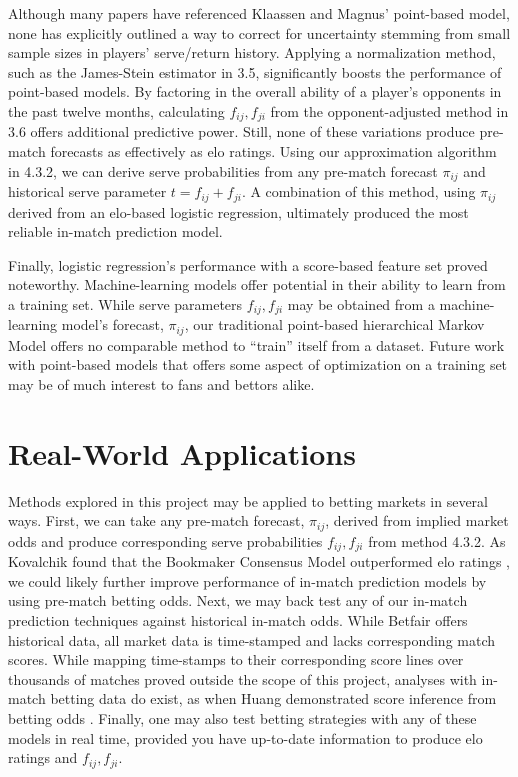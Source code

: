 \documentclass[chapterprefix=false]{report}
\begin{document}
Although many papers have referenced Klaassen and Magnus' point-based model, none has explicitly outlined a way to correct for uncertainty stemming from small sample sizes in players' serve/return history. Applying a normalization method, such as the James-Stein estimator in 3.5, significantly boosts the performance of point-based models. By factoring in the overall ability of a player's opponents in the past twelve months, calculating $f_{ij},f_{ji}$ from the opponent-adjusted method in 3.6 offers additional predictive power. Still, none of these variations produce pre-match forecasts as effectively as elo ratings. Using our approximation algorithm in 4.3.2, we can derive serve probabilities from any pre-match forecast $\pi_{ij}$ and historical serve parameter $t = f_{ij} + f_{ji}$. A combination of this method, using $\pi_{ij}$ derived from an elo-based logistic regression, ultimately produced the most reliable in-match prediction model.

Finally, logistic regression's performance with a score-based feature set proved noteworthy. Machine-learning models offer potential in their ability to learn from a training set. While serve parameters $f_{ij},f_{ji}$ may be obtained from a machine-learning model's forecast, $\pi_{ij}$, our traditional point-based hierarchical Markov Model offers no comparable method to ``train'' itself from a dataset. Future work with point-based models that offers some aspect of optimization on a training set may be of much interest to fans and bettors alike.

\section{Real-World Applications}

Methods explored in this project may be applied to betting markets in several ways. First, we can take any pre-match forecast, $\pi_{ij}$, derived from implied market odds and produce corresponding serve probabilities $f_{ij},f_{ji}$ from method 4.3.2. As Kovalchik found that the Bookmaker Consensus Model outperformed elo ratings \cite{Kovalchik2016}, we could likely further improve performance of in-match prediction models by using pre-match betting odds. Next, we may back test any of our in-match prediction techniques against historical in-match odds. While Betfair offers historical data, all market data is time-stamped and lacks corresponding match scores. While mapping time-stamps to their corresponding score lines over thousands of matches proved outside the scope of this project, analyses with in-match betting data do exist, as when Huang demonstrated score inference from betting odds \cite{Huang2011}. Finally, one may also test betting strategies with any of these models in real time, provided you have up-to-date information to produce elo ratings and $f_{ij},f_{ji}$.
\end{document}

